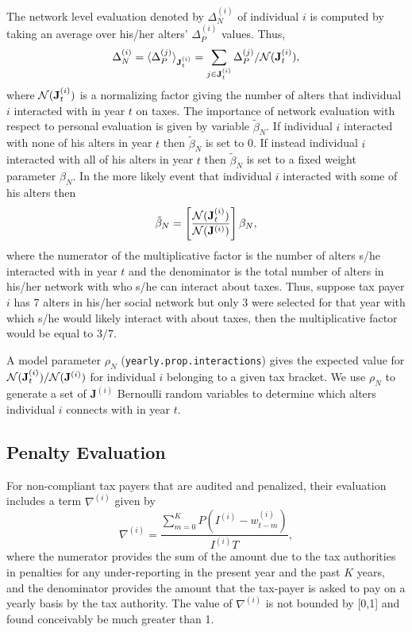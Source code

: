 \documentclass{NSF_proposal_mod}
\begin{document}
The network level evaluation denoted by $\Delta^{(i)}_N$ of individual $i$ is computed by taking an average over his/her alters' $\Delta_P^{(i)}$ values. Thus, 
\begin{equation}
\Delta_N^{(i)} = \langle \Delta_P^{(j)}\rangle_{\mathbf{J}^{(i)}_t}= \sum_{j\in\mathbf{J}^{(i)}_t} \Delta_P^{(j)}/ {{\cal N}(\mathbf{J}^{(i)}_t)},
\end{equation}
where ${\cal N}(\mathbf{J}^{(i)}_t)$ is a normalizing factor giving the number of alters that individual $i$ interacted with in year $t$ on taxes. The importance of network evaluation with respect to personal evaluation is given by variable $\tilde{\beta}_N$.  If individual $i$ interacted with none of his alters in year $t$ then $\tilde{\beta}_N$ is set to 0. If instead individual $i$ interacted with all of his alters in year $t$ then $\tilde{\beta}_N$ is set to a fixed weight parameter $\beta_N$. In the more likely event that individual $i$ interacted with some of his alters then 
\begin{equation}
\tilde{\beta}_N =\left[ \frac{{\cal N}(\mathbf{J}^{(i)}_t)}{{\cal N}(\mathbf{J}^{(i)})}\right ] {\beta}_N,
\end{equation}
where the numerator of the multiplicative factor is the number of alters s/he interacted with in year $t$ and the denominator is the total number of alters in his/her network with who s/he can interact about taxes. Thus, suppose tax payer $i$ has 7 alters in his/her social network but only 3 were selected for that year with which s/he would likely interact with about taxes, then the multiplicative factor would be equal to $3/7$.

A model parameter $\rho_N$ (\texttt{yearly.prop.interactions}) gives the expected value for ${{\cal N}(\mathbf{J}^{(i)}_t)}/{{\cal N}(\mathbf{J}^{(i)})}$ for individual $i$ belonging to a given tax bracket. We use $\rho_N$ to generate a set of $\mathbf{J}^{(i)}$ Bernoulli random variables to determine which alters individual $i$ connects with in year $t$. 

\subsection{Penalty Evaluation}
\label{Sec:Penalty_Evaluation}

For non-compliant tax payers that are audited and penalized, their evaluation includes a term $\nabla^{(i)}$ given by 
\begin{equation}
\nabla^{(i)}= \frac{\sum_{m=0}^K P(I^{(i)}-w^{(i)}_{t-m})}{I^{(i)}T},  
\end{equation}
where the numerator provides the sum of the amount due to the tax authorities in penalties for any under-reporting in the present year and the past $K$ years, and the denominator provides the amount that the tax-payer is asked to pay on a yearly basis by the tax authority. The value of $\nabla^{(i)}$ is not bounded by [0,1] and found conceivably be much greater than 1. 
\end{document}
